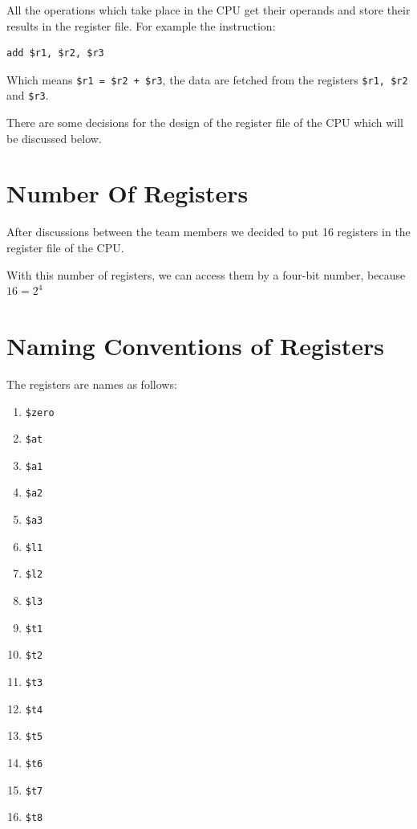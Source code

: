 \documentclass[12pt, dvipsnames, svgnames, x11names, oneside]{book}
\begin{document}
		All the operations which take place in the CPU get their operands and store their results in the register file. For example the instruction:
		
		\begin{lstlisting}
add $r1, $r2, $r3
		\end{lstlisting}
		
		\noindent Which means \texttt{\$r1 = \$r2 + \$r3}, the data are fetched from the registers \texttt{\$r1, \$r2} and \texttt{\$r3}.
		
		There are some decisions for the design of the register file of the CPU which will be discussed below.
		
		\section{Number Of Registers}\label{sec:num-of-regs}
		After discussions between the team members we decided to put 16 registers in the register file of the CPU.
		
		With this number of registers, we can access them by a four-bit number, because $16 = 2^4$
		
		\section{Naming Conventions of Registers}\label{sec:name-of-regs}
		The registers are names as follows:
		\begin{enumerate}
			\item \texttt{\$zero}
			\item \texttt{\$at}
			\item \texttt{\$a1}
			\item \texttt{\$a2}
			\item \texttt{\$a3}
			\item \texttt{\$l1}
			\item \texttt{\$l2}
			\item \texttt{\$l3}
			\item \texttt{\$t1}
			\item \texttt{\$t2}
			\item \texttt{\$t3}
			\item \texttt{\$t4}
			\item \texttt{\$t5}
			\item \texttt{\$t6}
			\item \texttt{\$t7}
			\item \texttt{\$t8}
		\end{enumerate}
		
\end{document}
